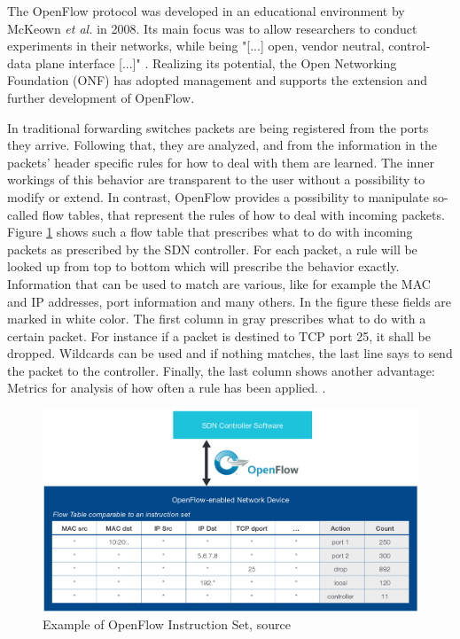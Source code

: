 The OpenFlow protocol was developed in an educational environment by McKeown \textit{et al.} \cite{mckeown2008openflow} in 2008. Its main focus was to allow researchers to conduct experiments in their networks, while being "[...] open, vendor neutral, control-data plane interface [...]" \cite{berde2014onos}. Realizing its potential, the Open Networking Foundation (ONF) has adopted management and supports the extension and further development of OpenFlow.

In traditional forwarding switches packets are being registered from the ports they arrive. Following that, they are analyzed, and from the information in the packets' header specific rules for how to deal with them are learned. The inner workings of this behavior are transparent to the user without a possibility to modify or extend. In contrast, OpenFlow provides a possibility to manipulate so-called flow tables, that represent the rules of how to deal with incoming packets. 
Figure \ref{img:of} shows such a flow table that prescribes what to do with incoming packets as prescribed by the SDN controller. For each packet, a rule will be looked up from top to bottom which will prescribe the behavior exactly. Information that can be used to match are various, like for example the MAC and IP addresses, port information and many others. In the figure these fields are marked in white color. The first column in gray prescribes what to do with a certain packet. For instance if a packet is destined to TCP port 25, it shall be dropped. Wildcards can be used and if nothing matches, the last line says to send the packet to the controller. Finally, the last column shows another advantage: Metrics for analysis of how often a rule has been applied. 
\cite{mckeown2008openflow}. 

\begin{figure}[h]
	\centering
	\includegraphics[width=1\linewidth]{images/of.png}
	\caption{Example of OpenFlow Instruction Set, source \cite{ofWhitePaper}}
	\label{img:of}
\end{figure}


